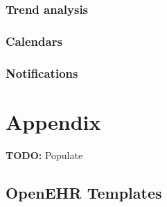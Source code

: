 \documentclass{article}
\begin{document}
\subsubsection{Trend analysis}
\subsubsection{Calendars}
\subsubsection{Notifications}

\section{Appendix}
\textbf{TODO:} Populate
\subsection{OpenEHR Templates}
\end{document}
